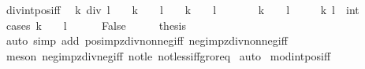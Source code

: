 \begin{isabellebody}
\endisatagproof
{\isafoldproof}%
%
\isadelimproof
%
\endisadelimproof
%
\isadelimdocument
%
\endisadelimdocument
%
\isatagdocument
%
\isamarkuptrue%
%
\endisatagdocument
{\isafolddocument}%
%
\isadelimdocument
%
\endisadelimdocument
{}\isamarkupfalse%
\ div{\isacharunderscore}{\kern0pt}int{\isacharunderscore}{\kern0pt}pos{\isacharunderscore}{\kern0pt}iff{\isacharcolon}{\kern0pt}\isanewline
\ \ {\isachardoublequoteopen}k\ div\ l\ {\isasymge}\ {}\ {\isasymlongleftrightarrow}\ k\ {\isacharequal}{\kern0pt}\ {}\ {\isasymor}\ l\ {\isacharequal}{\kern0pt}\ {}\ {\isasymor}\ k\ {\isasymge}\ {}\ {\isasymand}\ l\ {\isasymge}\ {}\isanewline
\ \ \ \ {\isasymor}\ k\ {\isacharless}{\kern0pt}\ {}\ {\isasymand}\ l\ {\isacharless}{\kern0pt}\ {}{\isachardoublequoteclose}\isanewline
\ \ \ k\ l\ {\isacharcolon}{\kern0pt}{\isacharcolon}{\kern0pt}\ int\isanewline
%
\isadelimproof
%
\endisadelimproof
%
\isatagproof
{}\isamarkupfalse%
\ {\isacharparenleft}{\kern0pt}cases\ {\isachardoublequoteopen}k\ {\isacharequal}{\kern0pt}\ {}\ {\isasymor}\ l\ {\isacharequal}{\kern0pt}\ {}{\isachardoublequoteclose}{\isacharparenright}{\kern0pt}\isanewline
\ \ \isamarkupfalse%
\ False\isanewline
\ \ \isamarkupfalse%
\ \isamarkupfalse%
\ {\isacharquery}{\kern0pt}thesis\isanewline
\ \ \ \isamarkupfalse%
\ {\isacharparenleft}{\kern0pt}auto\ simp\ add{\isacharcolon}{\kern0pt}\ pos{\isacharunderscore}{\kern0pt}imp{\isacharunderscore}{\kern0pt}zdiv{\isacharunderscore}{\kern0pt}nonneg{\isacharunderscore}{\kern0pt}iff\ neg{\isacharunderscore}{\kern0pt}imp{\isacharunderscore}{\kern0pt}zdiv{\isacharunderscore}{\kern0pt}nonneg{\isacharunderscore}{\kern0pt}iff{\isacharparenright}{\kern0pt}\isanewline
\ \ \ \ \isamarkupfalse%
\ {\isacharparenleft}{\kern0pt}meson\ neg{\isacharunderscore}{\kern0pt}imp{\isacharunderscore}{\kern0pt}zdiv{\isacharunderscore}{\kern0pt}neg{\isacharunderscore}{\kern0pt}iff\ not{\isacharunderscore}{\kern0pt}le\ not{\isacharunderscore}{\kern0pt}less{\isacharunderscore}{\kern0pt}iff{\isacharunderscore}{\kern0pt}gr{\isacharunderscore}{\kern0pt}or{\isacharunderscore}{\kern0pt}eq{\isacharparenright}{\kern0pt}\isanewline
{}\isamarkupfalse%
\ auto%
\endisatagproof
{\isafoldproof}%
%
\isadelimproof
\isanewline
%
\endisadelimproof
\isanewline
{}\isamarkupfalse%
\ mod{\isacharunderscore}{\kern0pt}int{\isacharunderscore}{\kern0pt}pos{\isacharunderscore}{\kern0pt}iff{\isacharcolon}{\kern0pt}\isanewline

\end{isabellebody}

